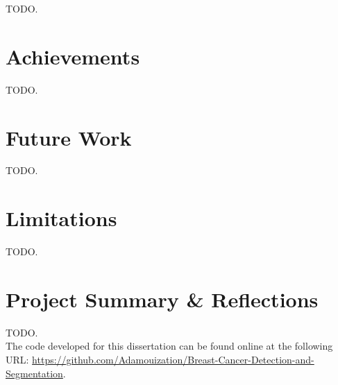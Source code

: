 TODO.


\section{Achievements}

TODO.
    

\section{Future Work}

TODO.


\section{Limitations}
\label{sec:conclusions-limitations}

TODO.
    

\section{Project Summary \& Reflections}

TODO.\\

The code developed for this dissertation can be found online at the following URL: \url{https://github.com/Adamouization/Breast-Cancer-Detection-and-Segmentation}.